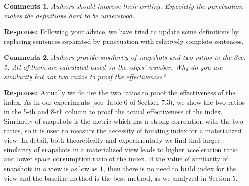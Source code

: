 \documentclass{article}
\newtheorem{Comments}{\textbf{Comments}}
\begin{document}
\begin{Comments}
Authors should improve their writing. Especially the punctuation makes the definitions hard to be understood.
\end{Comments}
\noindent \textbf{Response:} Following your advice, we have tried to update some definitions by replacing sentences separated by punctuation with relatively complete sentences.

\begin{Comments}
Authors provide similarity of snapshots and two ratios in the Sec. 5. All of them are calculated based on the edges’ number. Why do you use similarity but not two ratios to proof the effectiveness?
\end{Comments}
\noindent \textbf{Response:} Actually we do use the two ratios to proof the effectiveness of the index. As in our experiments (see Table 6 of Section 7.3), we show the two ratios in the 5-th and 8-th column to proof the actual effectiveness of the index. Similarity of snapshots is the metric which has a strong correlation with the two ratios, so it is used to measure the necessity of building index for a materialized view. In detail, both theoretically and experimentally we find that larger similarity of snapshots in a materialized view leads to higher acceleration ratio and lower space consumption ratio of the index. If the value of similarity of snapshots in a view is as low as $ 1 $, then there is no need to build index for the view and the baseline method is the best method, as we analyzed in Section 5.
\end{document}

